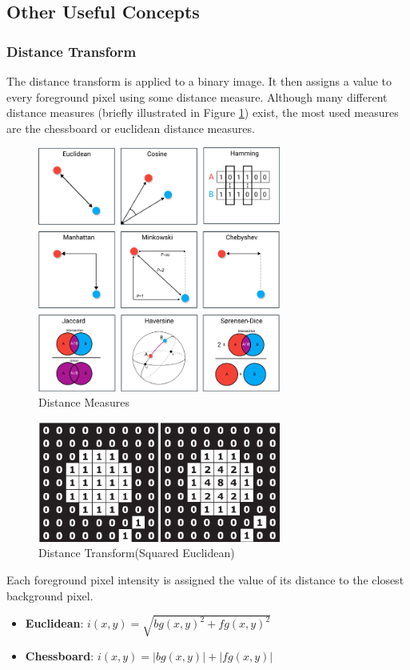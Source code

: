 \documentclass[a4paper, 12pt]{report}
\begin{document}
\subsection{Other Useful Concepts}
\subsubsection{Distance Transform}
The distance transform is applied to a binary image. It then assigns a value to
every foreground pixel using some distance measure. Although many different
distance measures (briefly illustrated in Figure \ref{fig:distances}) exist,
the most used measures are the chessboard or euclidean distance measures.
\begin{figure}[ht]
    \centering
    \includegraphics[width=8cm]{distances.png}
    \caption{Distance Measures~\cite{distance_measures}}
    \label{fig:distances}
\end{figure}

\begin{figure}[ht]
    \centering
    \includegraphics[width=8cm]{distance_transform.png}
    \caption{Distance Transform(Squared Euclidean)~\cite{distance_transform}}
    \label{fig:dt}
\end{figure}
Each foreground pixel intensity is assigned the value of its distance to the closest background pixel.
\begin{itemize}
    \item \textbf{Euclidean}: $i(x,y)=\sqrt{bg(x,y)^2+fg(x,y)^2}$
    \item \textbf{Chessboard}: $i(x,y)=|bg(x,y)|+|fg(x,y)|$
\end{itemize}
\end{document}
